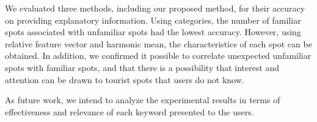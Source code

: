 \documentclass[journal]{IAENGtran}
\begin{document}
We evaluated three methods, including our proposed method, for their accuracy on providing explanatory information.
Using categories, the number of familiar spots associated with unfamiliar spots had the lowest accuracy.
However, using relative feature vector and harmonic mean, the characteristics of each spot can be obtained.
In addition, we confirmed it possible to correlate unexpected unfamiliar spots with familiar spots, and that there is a possibility that interest and attention can be drawn to tourist spots that users do not know.

As future work, we intend to analyze the experimental results in terms of effectiveness and relevance of each keyword presented to the users.


\ifCLASSOPTIONcaptionsoff
  \newpage
\fi
\end{document}
